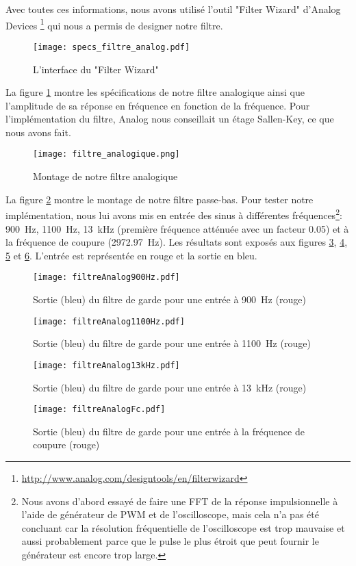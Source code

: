Avec toutes ces informations, nous avons utilisé l'outil "Filter Wizard" d'Analog Devices \footnote{\url{http://www.analog.com/designtools/en/filterwizard}} qui nous a permis de designer notre filtre.
\begin{figure}[htbp]
\centering
\texttt{[image: specs\_filtre\_analog.pdf]}
\caption{L'interface du "Filter Wizard"}
\label{fig:specsAnalogFilter}
\end{figure}
La figure \ref{fig:specsAnalogFilter} montre les spécifications de notre filtre analogique ainsi que l'amplitude de sa réponse en fréquence en fonction de la fréquence. Pour l'implémentation du filtre, Analog nous conseillait un étage Sallen-Key, ce que nous avons fait.
\begin{figure}[htbp]
\centering
\texttt{[image: filtre\_analogique.png]}
\caption{Montage de notre filtre analogique}
\label{fig:filtreAnalogique}
\end{figure}
La figure \ref{fig:filtreAnalogique} montre le montage de notre filtre passe-bas. Pour tester notre implémentation, nous lui avons mis en entrée des sinus à différentes fréquences\footnote{Nous avons d'abord essayé de faire une FFT de la réponse impulsionnelle à l'aide de générateur de PWM et de l'oscilloscope, mais cela n'a pas été concluant car la résolution fréquentielle de l'oscilloscope est trop mauvaise et aussi probablement parce que le pulse le plus étroit que peut fournir le générateur est encore trop large.}: \SI{900}{\hertz}, \SI{1100}{\hertz}, \SI{13}{\kilo\hertz} (première fréquence atténuée avec un facteur 0.05) et à la fréquence de coupure (\SI{2972.97}{\hertz}). Les résultats sont exposés aux figures \ref{fig:filtreAnalog900Hz}, \ref{fig:filtreAnalog1100Hz}, \ref{fig:filtreAnalog13kHz} et \ref{fig:filtreAnalogFc}. L'entrée est représentée en rouge et la sortie en bleu.
\begin{figure}[htbp]
\centering
\texttt{[image: filtreAnalog900Hz.pdf]}
\caption{Sortie (bleu) du filtre de garde pour une entrée à \SI{900}{\hertz} (rouge)}
\label{fig:filtreAnalog900Hz}
\end{figure}
\begin{figure}[htbp]
\centering
\texttt{[image: filtreAnalog1100Hz.pdf]}
\caption{Sortie (bleu) du filtre de garde pour une entrée à \SI{1100}{\hertz} (rouge)}
\label{fig:filtreAnalog1100Hz}
\end{figure}
\begin{figure}[htbp]
\centering
\texttt{[image: filtreAnalog13kHz.pdf]}
\caption{Sortie (bleu) du filtre de garde pour une entrée à \SI{13}{\kilo\hertz} (rouge)}
\label{fig:filtreAnalog13kHz}
\end{figure}
\begin{figure}[htbp]
\centering
\texttt{[image: filtreAnalogFc.pdf]}
\caption{Sortie (bleu) du filtre de garde pour une entrée à la fréquence de coupure (rouge)}
\label{fig:filtreAnalogFc}
\end{figure}

